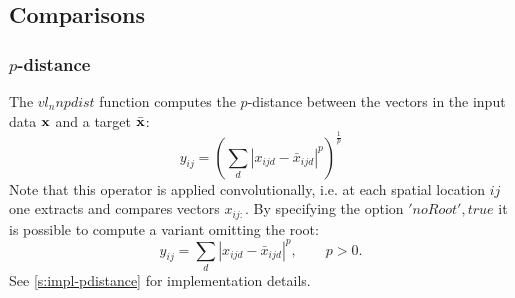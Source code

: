 \subsection{Comparisons}\label{s:comparisons}

\subsubsection{$p$-distance}\label{s:pdistance}

The $vl_nnpdist$ function computes the $p$-distance between the vectors in the input data $\mathbf{x}$ and a target $\bar{\mathbf{x}}$:
\[
y_{ij} = \left(\sum_d |x_{ijd} - \bar x_{ijd}|^p\right)^\frac{1}{p}
\]
Note that this operator is applied convolutionally, i.e. at each spatial location $ij$ one extracts and compares vectors $x_{ij:}$. By specifying the option $'noRoot', true$ it is possible to compute a variant omitting the root:
\[
y_{ij} = \sum_d |x_{ijd} - \bar x_{ijd}|^p, \qquad p > 0.
\]
See \cref{s:impl-pdistance} for implementation details.

%
%
%
%
%
%

